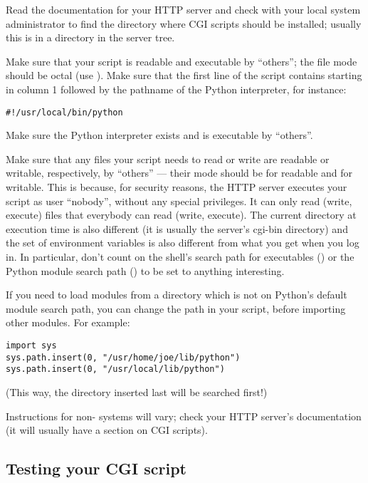 Read the documentation for your HTTP server and check with your local
system administrator to find the directory where CGI scripts should be
installed; usually this is in a directory  in the server tree.

Make sure that your script is readable and executable by ``others''; the
\UNIX{} file mode should be  octal (use ).  Make sure that the first line of the script contains
\code{\#!} starting in column 1 followed by the pathname of the Python
interpreter, for instance:

\begin{verbatim}
#!/usr/local/bin/python
\end{verbatim}

Make sure the Python interpreter exists and is executable by ``others''.

Make sure that any files your script needs to read or write are
readable or writable, respectively, by ``others'' --- their mode
should be  for readable and  for writable.  This
is because, for security reasons, the HTTP server executes your script
as user ``nobody'', without any special privileges.  It can only read
(write, execute) files that everybody can read (write, execute).  The
current directory at execution time is also different (it is usually
the server's cgi-bin directory) and the set of environment variables
is also different from what you get when you log in.  In particular, don't
count on the shell's search path for executables () or
the Python module search path () to be set to
anything interesting.

If you need to load modules from a directory which is not on Python's
default module search path, you can change the path in your script,
before importing other modules.  For example:

\begin{verbatim}
import sys
sys.path.insert(0, "/usr/home/joe/lib/python")
sys.path.insert(0, "/usr/local/lib/python")
\end{verbatim}

(This way, the directory inserted last will be searched first!)

Instructions for non-\UNIX{} systems will vary; check your HTTP server's
documentation (it will usually have a section on CGI scripts).


\subsection{Testing your CGI script}

